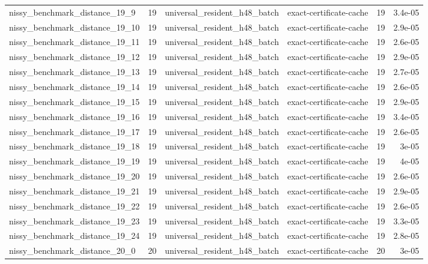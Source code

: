 {\begin{tabular}{lrllrr}
nissy\_benchmark\_distance\_19\_9 & 19 & universal\_resident\_h48\_batch & exact-certificate-cache & 19 & 3.4e-05 \\
nissy\_benchmark\_distance\_19\_10 & 19 & universal\_resident\_h48\_batch & exact-certificate-cache & 19 & 2.9e-05 \\
nissy\_benchmark\_distance\_19\_11 & 19 & universal\_resident\_h48\_batch & exact-certificate-cache & 19 & 2.6e-05 \\
nissy\_benchmark\_distance\_19\_12 & 19 & universal\_resident\_h48\_batch & exact-certificate-cache & 19 & 2.9e-05 \\
nissy\_benchmark\_distance\_19\_13 & 19 & universal\_resident\_h48\_batch & exact-certificate-cache & 19 & 2.7e-05 \\
nissy\_benchmark\_distance\_19\_14 & 19 & universal\_resident\_h48\_batch & exact-certificate-cache & 19 & 2.6e-05 \\
nissy\_benchmark\_distance\_19\_15 & 19 & universal\_resident\_h48\_batch & exact-certificate-cache & 19 & 2.9e-05 \\
nissy\_benchmark\_distance\_19\_16 & 19 & universal\_resident\_h48\_batch & exact-certificate-cache & 19 & 3.4e-05 \\
nissy\_benchmark\_distance\_19\_17 & 19 & universal\_resident\_h48\_batch & exact-certificate-cache & 19 & 2.6e-05 \\
nissy\_benchmark\_distance\_19\_18 & 19 & universal\_resident\_h48\_batch & exact-certificate-cache & 19 & 3e-05 \\
nissy\_benchmark\_distance\_19\_19 & 19 & universal\_resident\_h48\_batch & exact-certificate-cache & 19 & 4e-05 \\
nissy\_benchmark\_distance\_19\_20 & 19 & universal\_resident\_h48\_batch & exact-certificate-cache & 19 & 2.6e-05 \\
nissy\_benchmark\_distance\_19\_21 & 19 & universal\_resident\_h48\_batch & exact-certificate-cache & 19 & 2.9e-05 \\
nissy\_benchmark\_distance\_19\_22 & 19 & universal\_resident\_h48\_batch & exact-certificate-cache & 19 & 2.6e-05 \\
nissy\_benchmark\_distance\_19\_23 & 19 & universal\_resident\_h48\_batch & exact-certificate-cache & 19 & 3.3e-05 \\
nissy\_benchmark\_distance\_19\_24 & 19 & universal\_resident\_h48\_batch & exact-certificate-cache & 19 & 2.8e-05 \\
nissy\_benchmark\_distance\_20\_0 & 20 & universal\_resident\_h48\_batch & exact-certificate-cache & 20 & 3e-05 \\

\end{tabular}}
